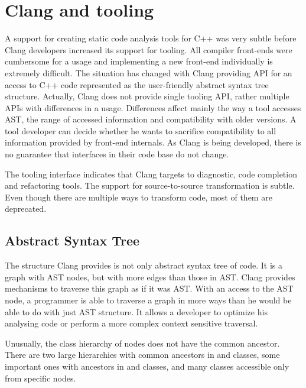\chapter{Clang and tooling}
\label{chapter-clang}
A support for creating static code analysis tools for C++ was very subtle before Clang developers increased its support for tooling. All compiler front-ends were cumbersome for a usage and implementing a new front-end individually is extremely difficult. The situation has changed with Clang providing API for an access to C++ code represented as the user-friendly abstract syntax tree structure. Actually, Clang does not provide single tooling API, rather multiple APIs with differences in a usage. Differences affect mainly the way a tool accesses AST, the range of accessed information and compatibility with older versions. A tool developer can decide whether he wants to sacrifice compatibility to all information provided by front-end internals. As Clang is being developed, there is no guarantee that interfaces in their code base do not change.

The tooling interface indicates that Clang targets to diagnostic, code completion and refactoring tools. The support for source-to-source transformation is subtle. Even though there are multiple ways to transform code, most of them are deprecated.

\section{Abstract Syntax Tree}
The structure Clang provides is not only abstract syntax tree of code. It is a graph with AST nodes, but with more edges than those in AST. Clang provides mechanisms to traverse this graph as if it was AST. With an access to the AST node, a programmer is able to traverse a graph in more ways than he would be able to do with just AST structure. It allows a developer to optimize his analysing code or perform a more complex context sensitive traversal.

Unusually, the class hierarchy of nodes does not have the common ancestor. There are two large hierarchies with common ancestors in  and  classes, some important ones with ancestors in  and  classes, and many classes accessible only from specific nodes.

